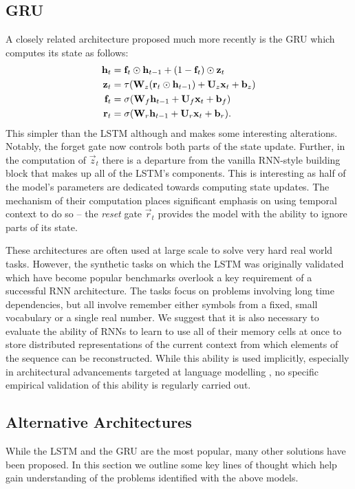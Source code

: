 \subsection{GRU}
A closely related architecture proposed much more recently is the
GRU \autocite{Cho2014} which computes its state as follows:
\begin{align}\label{eq:GRU}
	\mathbf{h}_t &= \mathbf{f}_t \odot \mathbf{h}_{t-1} + (1 - \mathbf{f}_t)\odot\mathbf{z}_t\\
	\mathbf{z}_t &= \tau(\mathbf{W}_z(\mathbf{r}_t \odot \mathbf{h}_{t-1}) + \mathbf{U}_z\mathbf{x}_t + \mathbf{b}_z)\\
	\mathbf{f}_t &= \sigma(\mathbf{W}_f\mathbf{h}_{t-1} + \mathbf{U}_f\mathbf{x}_t + \mathbf{b}_f)\\
	\mathbf{r}_t &= \sigma(\mathbf{W}_r\mathbf{h}_{t-1} + \mathbf{U}_r\mathbf{x}_t + \mathbf{b}_r).
\end{align} This simpler than the LSTM although and makes some interesting alterations.
Notably, the forget gate now controls both parts of the state
update. Further, in the computation of \(\vec{z}_t\) there is a departure from the vanilla
RNN-style building block that makes up all of the LSTM's components. This is interesting as
half of the model's parameters are
dedicated towards computing state updates. The mechanism of their computation places
significant emphasis on using temporal context to do so -- the \emph{reset} gate
\(\vec{r}_t\) provides the model with the ability to ignore parts of its state.

These architectures are often used at large scale to solve very hard real world tasks. However,
the synthetic tasks on which the LSTM was originally validated \autocite{Hochreiter1997} which have
become popular benchmarks
 overlook a key requirement of a successful RNN architecture. The tasks focus on problems involving long
time dependencies, but all involve remember either symbols from a fixed, small vocabulary or a single
real number. We suggest that it is also necessary to evaluate the ability of RNNs to learn to use
all of their memory cells at once to store distributed representations of the current context from which
elements of the sequence can be reconstructed. While this ability is used implicitly, especially in
architectural advancements targeted at language modelling \autocite{Cho2014b, Chan2015, Luong2016},
no specific empirical validation of this ability is regularly carried out.


\subsection{Alternative Architectures}
While the LSTM and the GRU are the most popular, many other solutions
have been proposed. In this section we outline some key lines of thought which help gain
understanding of the problems identified with the above models.

